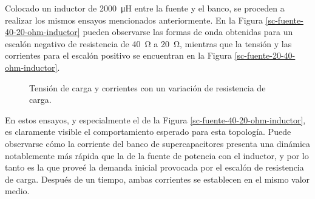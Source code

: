 Colocado un inductor de \SI{2000}{\micro\henry} entre la fuente y el banco, se proceden a realizar los mismos ensayos mencionados anteriormente. En la Figura \ref{sc-fuente-40-20-ohm-inductor} pueden observarse las formas de onda obtenidas para un escalón negativo de resistencia de \SI{40}{\ohm} a \SI{20}{\ohm}, mientras que la tensión y las corrientes para el escalón positivo se encuentran en la Figura \ref{sc-fuente-20-40-ohm-inductor}.

\begin{figure}[hbt!]
  \centering
  \caption{Tensión de carga y corrientes con un variación de resistencia de carga.}
  \label{sc-fuente-inductor}
\end{figure}

En estos ensayos, y especialmente el de la Figura \ref{sc-fuente-40-20-ohm-inductor}, es claramente visible el comportamiento esperado para esta topología. Puede observarse cómo la corriente del banco de supercapacitores presenta una dinámica notablemente más rápida que la de la fuente de potencia con el inductor, y por lo tanto es la que proveé la demanda inicial provocada por el escalón de resistencia de carga. Después de un tiempo, ambas corrientes se establecen en el mismo valor medio.

